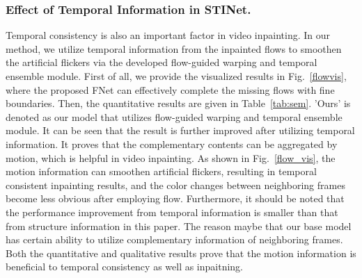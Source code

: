 \subsubsection{Effect of Temporal Information in STINet.}
Temporal consistency is also an important factor in video inpainting. In our method, we utilize temporal information from the inpainted flows to smoothen the artificial flickers via the developed flow-guided warping and temporal ensemble module. 
First of all, we provide the visualized results in Fig.~\ref{flowvis}, where the proposed FNet can effectively complete the missing flows with fine boundaries.
Then, the quantitative results are given in Table~\ref{tab:sem}.
'Ours' is denoted as our model that utilizes flow-guided warping and temporal ensemble module.
It can be seen that the result is further improved after utilizing temporal information. It proves that the complementary contents can be aggregated by motion, which is helpful in video inpainting. 
As shown in Fig.~\ref{flow_vis}, the motion information can smoothen artificial flickers, resulting in temporal consistent inpainting results, and the color changes between neighboring frames become less obvious after employing flow.
Furthermore, it should be noted that the performance improvement from temporal information is smaller than that from structure information in this paper.
The reason maybe that our base model has certain ability to utilize complementary information of neighboring frames.
Both the quantitative and qualitative results prove that the motion information is beneficial to temporal consistency as well as inpaitning.



